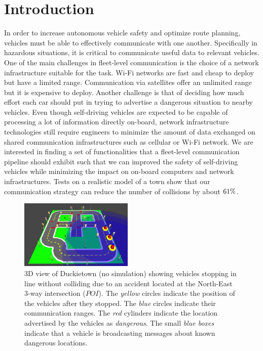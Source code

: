 \section{Introduction}
In order to increase autonomous vehicle safety and optimize route planning, vehicles must be able to effectively 
communicate with one another. Specifically in hazardous situations, it is critical to communicate useful data to 
relevant vehicles.
One of the main challenges in fleet-level communication is the choice of a network infrastructure suitable
for the task. Wi-Fi networks are fast and cheap to deploy but have a limited range. Communication via satellites
offer an unlimited range but it is expensive to deploy. Another challenge is that of deciding how much effort
each car should put in trying to advertise a dangerous situation to nearby vehicles. 
Even though self-driving vehicles are expected to be capable of processing a lot of information directly on-board, 
network infrastructure technologies still require engineers to minimize the amount of data exchanged on shared
communication infrastructures such as cellular or Wi-Fi network.
We are interested in finding a set of functionalities that a fleet-level communication pipeline should exhibit
such that we can improved the safety of self-driving vehicles while minimizing the impact on on-board computers
and network infrastructures.
Tests on a realistic model of a town show that our communication strategy can reduce the number of
collisions by about $\collision_ratio_reduction_perc\%$.

\begin{figure}[t]
	\vspace{0.2cm}
    \centering
    \includegraphics[width=0.48\textwidth]{figures/full-model_viewer.jpg}
    \caption{3D view of Duckietown (no simulation) showing vehicles stopping in line without colliding
    due to an accident located at the North-East 3-way intersection ($POI$).
    The \textit{yellow} circles indicate the position of the vehicles after they stopped. 
    The \textit{blue} circles indicate their communication ranges. The \textit{red} cylinders 
    indicate the location advertised by the vehicles as \textit{dangerous}. The small \textit{blue boxes} 
    indicate that a vehicle is broadcasting messages about known dangerous locations.  \label{fig:3d_viewer_full_model}}
\end{figure}

